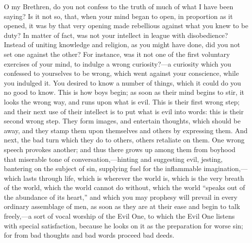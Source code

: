 O my Brethren, do you not confess to the truth of much
of what I have been saying? Is it not so, that, when your
mind began to open, in proportion as it opened, it was by
that very opening made rebellious against what you knew
to be duty? In matter of fact, was not your intellect in
league with disobedience? Instead of uniting knowledge
and religion, as you might have done, did you not set one
against the other? For instance, was it not one of the
first voluntary exercises of your mind, to indulge a
wrong curiosity?—a curiosity which you confessed to
yourselves to be wrong, which went against your
conscience, while you indulged it. You desired to know a
number of things, which it could do you no good to know.
This is how boys begin; as soon as their mind begins to
stir, it looks the wrong way, and runs upon what is evil.
This is their first wrong step; and their next use of
their intellect is to put what is evil into words: this
is their second wrong step. They form images, and
entertain thoughts, which should be away, and they stamp
them upon themselves and others by expressing them. And
next, the bad turn which they do to others, others
retaliate on them. One wrong speech provokes another; and
thus there grows up among them from boyhood that
miserable tone of conversation,—hinting and
suggesting evil, jesting, bantering on the subject of
sin, supplying fuel for the inflammable
imagination,—which lasts through life, which is
wherever the world is, which is the very breath of the
world, which the world cannot do without, which the world
``speaks out of the abundance of its heart,'' and
which you may prophesy will prevail in every ordinary
assemblage of men, as soon as they are at their ease and
begin to talk freely,—a sort of vocal worship of the
Evil One, to which the Evil One listens with special
satisfaction, because he looks on it as the preparation
for worse sin; for from bad thoughts and bad words
proceed bad deeds.

